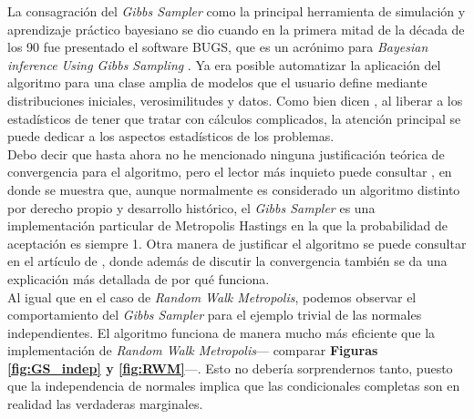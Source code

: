 La consagración del \textit{Gibbs Sampler} como la principal herramienta de simulación y aprendizaje práctico bayesiano se dio cuando en la primera mitad de la década de los 90 fue presentado el 	software BUGS, que es un acrónimo para \textit{Bayesian inference Using Gibbs Sampling} \parencite{Betancourt18}. Ya era posible automatizar la aplicación del algoritmo para una clase amplia de modelos que el usuario define mediante distribuciones iniciales, verosimilitudes y datos. Como bien dicen \textcite{CasellaGeorge92}, al liberar a los estadísticos de tener que tratar con cálculos complicados, la atención principal se puede dedicar a los aspectos estadísticos de los problemas.\\ 

Debo decir que hasta ahora no he mencionado ninguna justificación teórica de convergencia para el algoritmo, pero el lector más inquieto puede consultar \textcite{Geyer05}, en donde se muestra que, aunque normalmente es considerado un algoritmo distinto por derecho propio y desarrollo histórico, el \textit{Gibbs Sampler} es una implementación particular de Metropolis Hastings en la que la probabilidad de aceptación es siempre 1. Otra manera de justificar el algoritmo se puede consultar en el artículo de \textcite{CasellaGeorge92}, donde además de discutir la convergencia también se da una explicación más detallada de por qué funciona.\\  

Al igual que en el caso de \textit{Random Walk Metropolis}, podemos observar el comportamiento del \textit{Gibbs Sampler} para el ejemplo trivial de las normales independientes. El algoritmo funciona de manera mucho más eficiente que la implementación de \textit{Random Walk Metropolis}--- comparar \textbf{Figuras \ref{fig:GS_indep} y \ref{fig:RWM}}---. Esto no debería sorprendernos tanto, puesto que la independencia de normales implica que las condicionales completas son en realidad las verdaderas marginales.\\ 


